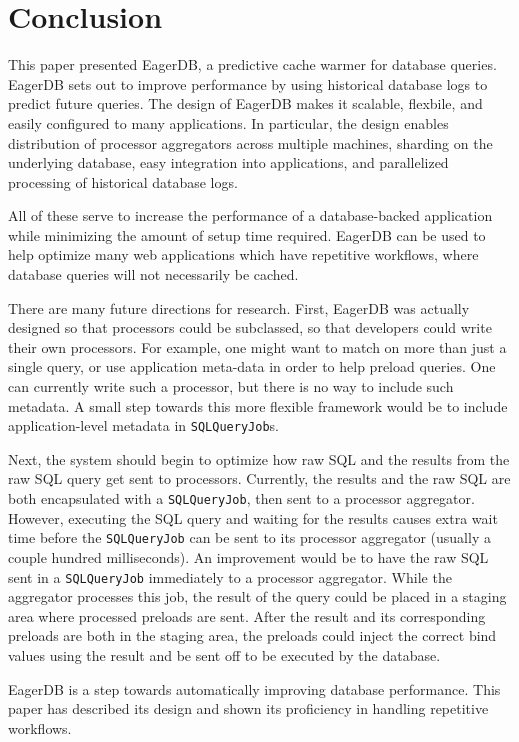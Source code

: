 \documentclass[12pt]{article}
\begin{document}
\section{Conclusion}

This paper presented EagerDB, a predictive cache warmer for database queries. EagerDB sets out to improve performance by using historical database logs to predict future queries. The design of EagerDB makes it scalable, flexbile, and easily configured to many applications. In particular, the design enables distribution of processor aggregators across multiple machines, sharding on the underlying database, easy integration into applications, and parallelized processing of historical database logs.

All of these serve to increase the performance of a database-backed application while minimizing the amount of setup time required. EagerDB can be used to help optimize many web applications which have repetitive workflows, where database queries will not necessarily be cached.

There are many future directions for research. First, EagerDB was actually designed so that processors could be subclassed, so that developers could write their own processors. For example, one might want to match on more than just a single query, or use application meta-data in order to help preload queries. One can currently write such a processor, but there is no way to include such metadata. A small step towards this more flexible framework would be to include application-level metadata in \texttt{SQLQueryJob}s.

Next, the system should begin to optimize how raw SQL and the results from the raw SQL query get sent to processors. Currently, the results and the raw SQL are both encapsulated with a \texttt{SQLQueryJob}, then sent to a processor aggregator. However, executing the SQL query and waiting for the results causes extra wait time before the \texttt{SQLQueryJob} can be sent to its processor aggregator (usually a couple hundred milliseconds). An improvement would be to have the raw SQL sent in a \texttt{SQLQueryJob} immediately to a processor aggregator. While the aggregator processes this job, the result of the query could be placed in a staging area where processed preloads are sent. After the result and its corresponding preloads are both in the staging area, the preloads could inject the correct bind values using the result and be sent off to be executed by the database.

EagerDB is a step towards automatically improving database performance. This paper has described its design and shown its proficiency in handling repetitive workflows.
\end{document}
